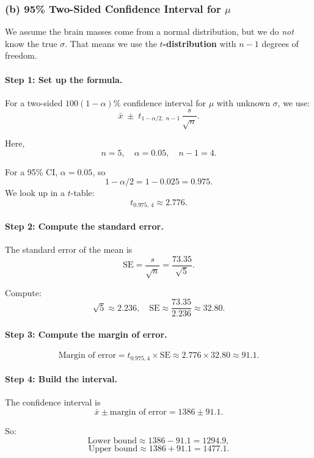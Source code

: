\documentclass[11pt,letterpaper]{article}
\theoremstyle{remark}
\begin{document}
\subsubsection*{(b) 95\% Two-Sided Confidence Interval for $\mu$}

We assume the brain masses come from a normal distribution, but we do \emph{not} know the true $\sigma$.
That means we use the \textbf{$t$-distribution} with $n-1$ degrees of freedom.

\paragraph{Step 1: Set up the formula.}

For a two-sided $100(1-\alpha)\%$ confidence interval for $\mu$ with unknown $\sigma$, we use:
\[
\bar{x} \;\pm\; t_{1 - \alpha/2,\; n-1} \,\frac{s}{\sqrt{n}}.
\]

Here,
\[
n = 5,\quad \alpha = 0.05,\quad n-1 = 4.
\]

For a 95\% CI, $\alpha = 0.05$, so
\[
1 - \alpha/2 = 1 - 0.025 = 0.975.
\]
We look up in a $t$-table:
\[
t_{0.975,\,4} \approx 2.776.
\]

\paragraph{Step 2: Compute the standard error.}

The standard error of the mean is
\[
\text{SE} = \frac{s}{\sqrt{n}} = \frac{73.35}{\sqrt{5}}.
\]

Compute:
\[
\sqrt{5} \approx 2.236, \quad
\text{SE} \approx \frac{73.35}{2.236} \approx 32.80.
\]

\paragraph{Step 3: Compute the margin of error.}

\[
\text{Margin of error} = t_{0.975,4} \times \text{SE}
\approx 2.776 \times 32.80 \approx 91.1.
\]

\paragraph{Step 4: Build the interval.}

The confidence interval is
\[
\bar{x} \pm \text{margin of error}
= 1386 \pm 91.1.
\]

So:
\[
\text{Lower bound} \approx 1386 - 91.1 = 1294.9,
\]
\[
\text{Upper bound} \approx 1386 + 91.1 = 1477.1.
\]
\end{document}
